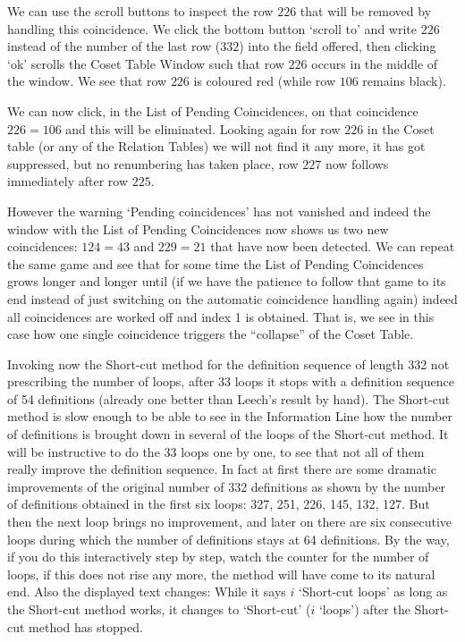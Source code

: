 We can use the scroll buttons to inspect the row $226$ that will be
removed by handling this coincidence. We click the bottom button
`scroll to' and write $226$ instead of the number of the last row
($332$) into the field offered, then clicking `ok' scrolls the
Coset Table Window such that row $226$ occurs in the middle of the
window. We see that row $226$ is coloured red (while row $106$
remains black).

We can now click, in the List of Pending Coincidences, on that
coincidence $226 = 106$ and this will be eliminated. Looking again for
row $226$ in the Coset table (or any of the Relation Tables) we will
not find it any more, it has got suppressed, but no renumbering has
taken place, row $227$ now follows immediately after row $225$.

However the warning `Pending coincidences' has not vanished and indeed
the window with the List of Pending Coincidences now shows us two new
coincidences: $124 = 43$ and $229 = 21$ that have now been
detected. We can repeat the same game and see that for some time the
List of Pending Coincidences grows longer and longer until (if we have
the patience to follow that game to its end instead of just switching
on the automatic coincidence handling again) indeed all coincidences
are worked off and index 1 is obtained. That is, we see in this
case how one single coincidence triggers the ``collapse'' of the Coset
Table.

Invoking now the Short-cut method for the definition sequence of
length 332 not prescribing the number of loops, after 33 loops it
stops with a definition sequence of 54 definitions (already one better
than Leech's result by hand). The Short-cut method is slow enough to
be able to see in the Information Line how the number of definitions
is brought down in several of the loops of the Short-cut method. It
will be instructive to do the 33 loops one by one, to see that not all
of them really improve the definition sequence. In fact at first there
are some dramatic improvements of the original number of 332
definitions as shown by the number of definitions obtained in the
first six loops: 327, 251, 226, 145, 132, 127. But then
the next loop brings no improvement, and later on there are six
consecutive loops during which the number of definitions stays at 64
definitions. By the way, if you do this interactively step by step,
watch the counter for the number of loops, if this does not rise any
more, the method will have come to its natural end. Also the displayed
text changes: While it says $i$ `Short-cut loops' as long as the
Short-cut method works, it changes to `Short-cut' ($i$ `loops') after
the Short-cut method has stopped.

